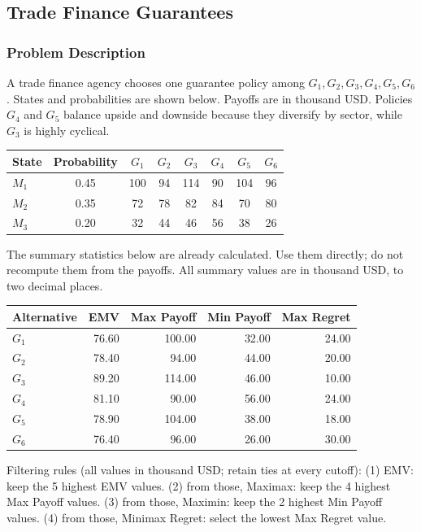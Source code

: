 
\subsection{Trade Finance Guarantees}\label{sec:c9-finance}
\subsubsection*{Problem Description}
A trade finance agency chooses one guarantee policy among $G_1,G_2,G_3,G_4,G_5,G_6$. States and probabilities are shown below.
Payoffs are in thousand USD. Policies $G_4$ and $G_5$ balance upside and downside because they diversify by sector, while $G_3$ is highly cyclical.
\begin{center}
	\begin{tabular}{l c c c c c c c}
		\toprule
		State & Probability & $G_1$ & $G_2$ & $G_3$ & $G_4$ & $G_5$ & $G_6$ \\
		\midrule
		$M_1$ & 0.45 & 100 & 94 & 114 & 90 & 104 & 96 \\
		$M_2$ & 0.35 & 72 & 78 & 82 & 84 & 70 & 80 \\
		$M_3$ & 0.20 & 32 & 44 & 46 & 56 & 38 & 26 \\
		\bottomrule
	\end{tabular}
\end{center}
The summary statistics below are already calculated. Use them directly; do not recompute them from the payoffs. All summary values are in thousand USD, to two decimal places.
\begin{center}
\begin{tabular}{lrrrr}
\toprule
Alternative & EMV & Max Payoff & Min Payoff & Max Regret \\
\midrule
$G_1$ & 76.60 & 100.00 & 32.00 & 24.00 \\
$G_2$ & 78.40 & 94.00 & 44.00 & 20.00 \\
$G_3$ & 89.20 & 114.00 & 46.00 & 10.00 \\
$G_4$ & 81.10 & 90.00 & 56.00 & 24.00 \\
$G_5$ & 78.90 & 104.00 & 38.00 & 18.00 \\
$G_6$ & 76.40 & 96.00 & 26.00 & 30.00 \\
\bottomrule
\end{tabular}
\end{center}
Filtering rules (all values in thousand USD; retain ties at every cutoff):
(1) EMV: keep the 5 highest EMV values.
(2) from those, Maximax: keep the 4 highest Max Payoff values.
(3) from those, Maximin: keep the 2 highest Min Payoff values.
(4) from those, Minimax Regret: select the lowest Max Regret value.

